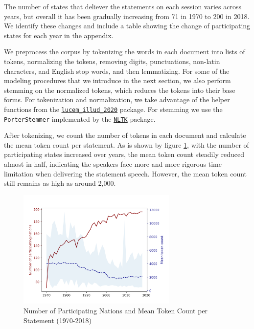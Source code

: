 \documentclass[final,authoryear,3p,12pt,times,hidelinks]{elsarticle}
\begin{document}


The number of states that deliever the statements on each session varies across years, but overall it has been gradually increasing from 71 in 1970 to 200 in 2018. We identify these changes and include a table showing the change of participating states for each year in the appendix. 

We preprocess the corpus by tokenizing the words in each document into lists of tokens, normalizing the tokens, removing digits, punctuations, non-latin characters, and English stop words, and then lemmatizing. For some of the modeling procedures that we introduce in the next section, we also perform stemming on the normalized tokens, which reduces the tokens into their base forms. For tokenization and normalization, we take advantage of the helper functions from the \href{https://github.com/Computational-Content-Analysis-2020/lucem_illud_2020/}{\texttt{lucem\_illud\_2020}} package. For stemming we use the \texttt{PorterStemmer} implemented by the \href{https://www.nltk.org/}{\texttt{NLTK}} package. 

After tokenizing, we count the number of tokens in each document and calculate the mean token count per statement. As is shown by figure \ref{fig:number of states and mean token count}, with the number of participating states increased over years, the mean token count steadily reduced almost in half, indicating the speakers face more and more rigorous time limitation when delivering the statement speech. However, the mean token count still remains as high as around 2,000. 

\begin{figure}[ht!]
  \begin{center}
    \includegraphics[width=0.7\textwidth]{graphs/number_of_states_and_mean_token_count.png}
    \caption{Number of Participating Nations and Mean Token Count per Statement (1970-2018)}
    \label{fig:number of states and mean token count}
  \end{center}
\end{figure}
\end{document}
